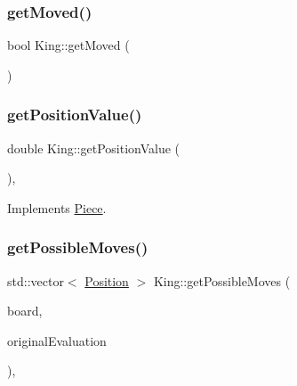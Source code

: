 \mbox{\label{class_king_af1a2ad00bec8f420581666d1f3d4966d}} 
\subsubsection{\texorpdfstring{get\+Moved()}{getMoved()}}
{\footnotesize\ttfamily bool King\+::get\+Moved (\begin{DoxyParamCaption}{ }\end{DoxyParamCaption})}

\mbox{\label{class_king_a047413f5f6df784b2fd308f20e356ea4}} 
\subsubsection{\texorpdfstring{get\+Position\+Value()}{getPositionValue()}}
{\footnotesize\ttfamily double King\+::get\+Position\+Value (\begin{DoxyParamCaption}{ }\end{DoxyParamCaption})\hspace{0.3cm}{\ttfamily [override]}, {\ttfamily [virtual]}}



Implements \hyperlink{class_piece_a4adfa58b4f0368c9a5859afcf294e0a4}{Piece}.

\mbox{\label{class_king_ac320306876c17161cba6db2f4255751a}} 
\subsubsection{\texorpdfstring{get\+Possible\+Moves()}{getPossibleMoves()}}
{\footnotesize\ttfamily std\+::vector$<$ \hyperlink{struct_position}{Position} $>$ King\+::get\+Possible\+Moves (\begin{DoxyParamCaption}\item[{std\+::shared\+\_\+ptr$<$ \hyperlink{class_base_board}{Base\+Board} $>$}]{board,  }\item[{bool}]{original\+Evaluation }\end{DoxyParamCaption})\hspace{0.3cm}{\ttfamily [override]}, {\ttfamily [virtual]}}



